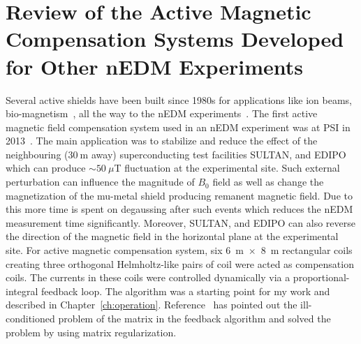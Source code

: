 
\section{Review of the Active Magnetic Compensation Systems Developed for Other nEDM Experiments}


Several active shields have been built since 1980s for applications like ion beams, bio-magnetism~\cite{active_raw_app_0,active_raw_app_1,active_raw_app_3,active_raw_app_4,active_raw_app_5,active_raw_app_6}, all the way to the nEDM experiments~\cite{bea,lins}. The first active magnetic field compensation system used in an nEDM experiment was at PSI in 2013~\cite{bea}. The main application was to stabilize and reduce the effect of the neighbouring ($\mathrm{30~m}$ away) superconducting test facilities SULTAN, and EDIPO which can produce $\sim50~\mu$T fluctuation at the experimental site. Such external perturbation can influence the magnitude of $B_0$ field as well as change the magnetization of the mu-metal shield producing remanent magnetic field. Due to this more time is spent on degaussing after such events which reduces the nEDM measurement time significantly. Moreover, SULTAN, and EDIPO can also reverse the direction of the magnetic field in the horizontal plane at the experimental site. For active magnetic compensation system, six 6~m~$\times$~8~m rectangular coils creating three orthogonal Helmholtz-like pairs of coil were acted as compensation coils. The currents in these coils were controlled dynamically via a proportional-integral feedback loop. The algorithm was a starting point for my work and described in Chapter~\ref{ch:operation}. Reference~\cite{bea} has pointed out the ill-conditioned problem of the matrix in the feedback algorithm and solved the problem by using matrix regularization.

